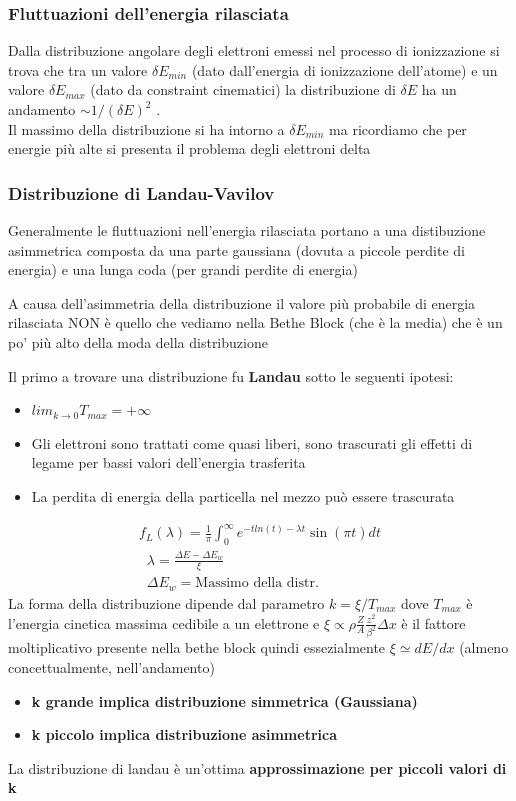 \subsubsection*{Fluttuazioni dell'energia rilasciata}
Dalla distribuzione angolare degli elettroni emessi nel processo di ionizzazione si trova che tra un valore $\delta E_{min}$ (dato dall'energia di ionizzazione dell'atome) e un valore $\delta E_{max}$ (dato da constraint cinematici) la distribuzione di $\delta E$ ha un andamento $\sim 1/(\delta E)^2$ .
\\
Il massimo della distribuzione si ha intorno a $\delta E_{min}$ ma ricordiamo che per energie più alte si presenta il problema degli elettroni delta

\subsubsection*{Distribuzione di Landau-Vavilov}

Generalmente le fluttuazioni nell'energia rilasciata portano a una distibuzione asimmetrica composta da una parte gaussiana (dovuta a piccole perdite di energia) e una lunga coda (per grandi perdite di energia)

\begin{note}
    A causa dell'asimmetria della distribuzione il valore più probabile di energia rilasciata NON è quello che vediamo nella Bethe Block (che è la media) che è un po' più alto della moda della distribuzione
\end{note}
Il primo a trovare una distribuzione fu \textbf{Landau} sotto le seguenti ipotesi:
\begin{itemize}
    \item $lim_{k \to0} T_{max}= +\infty$
    \item Gli elettroni sono trattati come quasi liberi, sono trascurati gli effetti di legame per bassi valori dell'energia trasferita
    \item La perdita di energia della particella nel mezzo può essere trascurata
\end{itemize}

\[
\begin{aligned}
    f_L(\lambda)=\frac{1}{\pi}\int_0^\infty e^{-t ln (t)-\lambda t }\sin (\pi t) dt
\\
\;\;\lambda=\frac{\Delta E -\Delta E_w}{\xi} \;\;
\\
\;\;\Delta E_w=\text{Massimo della distr.}
\end{aligned}\]
La forma della distribuzione dipende dal parametro $k=\xi/T_{max}$ dove $T_{max}$ è l'energia cinetica massima cedibile a un elettrone e $\xi \propto \rho\frac{Z}{A}\frac{z^2}{\beta^2} \Delta x$  è il fattore moltiplicativo presente nella bethe block quindi essezialmente $\xi \simeq dE/dx$ (almeno concettualmente, nell'andamento)
\begin{itemize}
    \item \textbf{k grande implica distribuzione simmetrica (Gaussiana)}
\item \textbf{k piccolo implica distribuzione asimmetrica}

\end{itemize}
La distribuzione di landau è un'ottima \textbf{approssimazione per piccoli valori di k}

